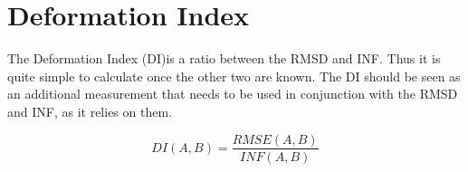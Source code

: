 \documentclass{article}
\begin{document}
\section{Deformation Index}
The Deformation Index (DI)is a ratio between the RMSD and INF. Thus it is quite simple to calculate once the other two are known. The DI should be seen as an additional measurement that needs to be used in conjunction with the RMSD and INF, as it relies on them.

\begin{equation}
    \label{eq:di}
    DI(A, B) = \frac{RMSE(A, B)}{INF(A, B)}
\end{equation}
\end{document}
